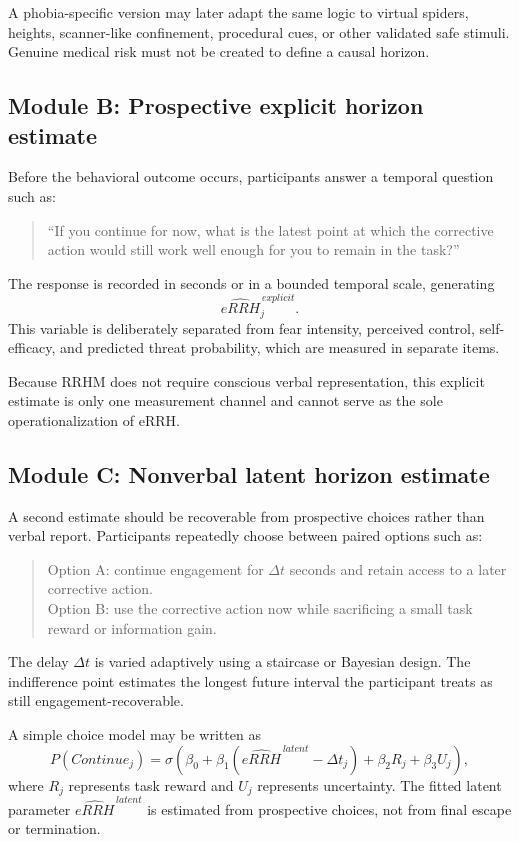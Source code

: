 \documentclass[11pt]{article}
\begin{document}
A phobia-specific version may later adapt the same logic to virtual spiders, heights, scanner-like confinement, procedural cues, or other validated safe stimuli. Genuine medical risk must not be created to define a causal horizon.

\subsection{Module B: Prospective explicit horizon estimate}
Before the behavioral outcome occurs, participants answer a temporal question such as:
\begin{quote}
``If you continue for now, what is the latest point at which the corrective action would still work well enough for you to remain in the task?''
\end{quote}
The response is recorded in seconds or in a bounded temporal scale, generating
\[
\widehat{eRRH}^{\,explicit}_{j}.
\]
This variable is deliberately separated from fear intensity, perceived control, self-efficacy, and predicted threat probability, which are measured in separate items.

Because RRHM does not require conscious verbal representation, this explicit estimate is only one measurement channel and cannot serve as the sole operationalization of eRRH.

\subsection{Module C: Nonverbal latent horizon estimate}
A second estimate should be recoverable from prospective choices rather than verbal report. Participants repeatedly choose between paired options such as:
\begin{quote}
Option A: continue engagement for $\Delta t$ seconds and retain access to a later corrective action.\\
Option B: use the corrective action now while sacrificing a small task reward or information gain.
\end{quote}
The delay $\Delta t$ is varied adaptively using a staircase or Bayesian design. The indifference point estimates the longest future interval the participant treats as still engagement-recoverable.

A simple choice model may be written as
\[
P(Continue_j)=\sigma\left(\beta_0+\beta_1(\widehat{eRRH}^{\,latent}-\Delta t_j)+\beta_2R_j+\beta_3U_j\right),
\]
where $R_j$ represents task reward and $U_j$ represents uncertainty. The fitted latent parameter $\widehat{eRRH}^{\,latent}$ is estimated from prospective choices, not from final escape or termination.
\end{document}
